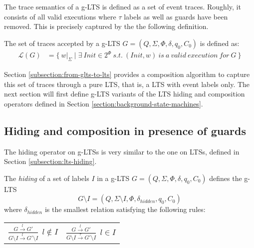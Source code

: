 The trace semantics of a g-LTS is defined as a set of event traces. Roughly, it consists of all valid executions where $\tau$ labels as well as guards have been removed. This is precisely captured by the the following definition.

\begin{definition}
The set of traces accepted by a g-LTS $G = (Q,\Sigma,\Phi,\delta,q_{0},C_{0})$ is defined as:
\begin{align*}
\mathcal{L}(G) &= \{~w|_{\Sigma} \mid \exists~Init \in 2^\Phi~s.t.~(Init,w)~is~a~valid~execution~for~G~\}
\end{align*}
\end{definition}

Section \ref{subsection:from-glts-to-lts} provides a composition algorithm to capture this set of traces through a pure LTS, that is, a LTS with event labels only. The next section will first define g-LTS variants of the LTS hiding and composition operators defined in Section \ref{section:background-state-machines}.

\subsection{Hiding and composition in presence of guards}

The hiding operator on g-LTSs is very similar to the one on LTSs, defined in Section \ref{subsection:lts-hiding}. 

\begin{definition}
The \emph{hiding} of a set of labels $I$ in a g-LTS $G = (Q,\Sigma,\Phi,\delta,q_{0},C_{0})$ defines the g-LTS
\begin{equation*}
G \setminus I = (Q,\Sigma \setminus I,\Phi,\delta_{hidden},q_{0},C_0)
\end{equation*}
\noindent where $\delta_{hidden}$ is the smallest relation satisfying the following rules:
\begin{center}
\begin{tabular}{cc}
$\frac{\displaystyle G \stackrel{l}{\longrightarrow} G'}{\displaystyle G \setminus I \stackrel{l}{\longrightarrow} G' \setminus I}~~l \notin I$ & 
$\frac{\displaystyle G \stackrel{l}{\longrightarrow} G'}{\displaystyle G \setminus I \stackrel{\tau}{\longrightarrow} G' \setminus I}~~l \in I$ \\
\end{tabular}
\end{center}
\end{definition}

